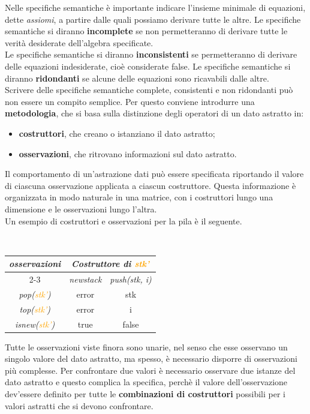 \documentclass[12pt]{report}
\begin{document}
 	Nelle specifiche semantiche è importante indicare l'insieme minimale di equazioni, dette \textit{assiomi}, a partire dalle quali possiamo derivare tutte le altre. Le specifiche semantiche si diranno \textbf{incomplete} se non permetteranno di derivare tutte le verità desiderate dell'algebra specificate. \\
 	Le specifiche semantiche si diranno \textbf{inconsistenti} se permetteranno di derivare delle equazioni indesiderate, cioè considerate false. Le specifiche semantiche si diranno \textbf{ridondanti} se alcune delle equazioni sono ricavabili dalle altre. \\
 	Scrivere delle specifiche semantiche complete, consistenti e non ridondanti può non essere un compito semplice. Per questo conviene introdurre una \textbf{metodologia}, che si basa sulla distinzione degli operatori di un dato astratto in:
 	\begin{itemize}
 		\item \textbf{costruttori}, che creano o istanziano il dato astratto;
 		\item \textbf{osservazioni}, che ritrovano informazioni sul dato astratto.
 	\end{itemize}
 	Il comportamento di un'astrazione dati può essere specificata riportando il valore di ciascuna osservazione applicata a ciascun costruttore. Questa informazione è organizzata in modo naturale in una matrice, con i costruttori lungo una dimensione e le osservazioni lungo l'altra. \\
 	Un esempio di costruttori e osservazioni per la pila è il seguente.
 	\begin{center}
\ 	\begin{tabular}{|c|c|c|}
 		\hline
 		\multirow{2}{*}{\textbf{\textit{osservazioni}}} & \multicolumn{2}{c|}{\textbf{\textit{Costruttore di \textcolor{orange}{stk'}}}} \\ \cline{2-3}
 		& \textit{newstack} & \textit{push(stk, i)} \\ \hline
 		\textit{pop(\textcolor{orange}{stk'})}           & error             & stk                   \\ \hline
 		\textit{top(\textcolor{orange}{stk'})}           & error             & i                     \\ \hline
 		\textit{isnew(\textcolor{orange}{stk'})}         & true              & false                 \\ \hline
 	\end{tabular}
 	\end{center}
 	Tutte le osservazioni viste finora sono unarie, nel senso che esse osservano un singolo valore del dato astratto, ma spesso, è necessario disporre di osservazioni più complesse. Per confrontare due valori è necessario osservare due istanze del dato astratto e questo complica la specifica, perchè il valore dell'osservazione dev'essere definito per tutte le \textbf{combinazioni di costruttori} possibili per i valori astratti che si devono confrontare.
\end{document}

